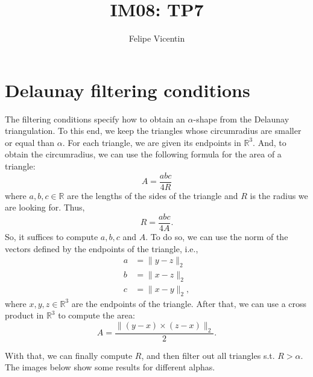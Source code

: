 \documentclass{article}
\title{IM08: TP7}
\author{Felipe Vicentin}
\begin{document}
    \maketitle


    \section{Delaunay filtering conditions}
    The filtering conditions specify how to obtain an $\alpha$-shape from the Delaunay triangulation.
    To this end, we keep the triangles whose circumradius are smaller or equal than $\alpha$.
    For each triangle, we are given its endpoints in $\mathbb{R}^3$. And, to obtain the circumradius, we can use the following formula for the area of a triangle:
    \[
        A = \frac{a b c}{4 R}
    \]
    where $a, b, c \in \mathbb{R}$ are the lengths of the sides of the triangle and $R$ is the radius we are looking for.
    Thus,
    \[
        R = \frac{a b c}{4 A}.
    \]
    So, it suffices to compute $a, b, c$ and $A$.
    To do so, we can use the norm of the vectors defined by the endpoints of the triangle, i.e.,
    \begin{align*}
        a &= \| y - z \|_2 \\
        b &= \| x - z \|_2 \\
        c &= \| x - y \|_2,
    \end{align*}
    where $x, y, z \in \mathbb{R}^3$ are the endpoints of the triangle.
    After that, we can use a cross product in $\mathbb{R}^3$ to compute the area:
    \[
        A = \frac{\| (y - x) \times (z - x) \|_2}{2}.
    \]

    With that, we can finally compute $R$, and then filter out all triangles s.t. $R > \alpha$.
    The images below show some results for different alphas.
\end{document}
